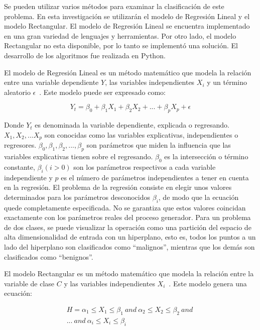 \documentclass[conference]{IEEEtran}
\begin{document}
Se pueden utilizar varios métodos para examinar la clasificación de este problema. En esta investigación se utilizarán el modelo de Regresión Lineal y el modelo Rectangular. El modelo de Regresión Lineal se encuentra implementado en una gran variedad de lenguajes y herramientas. Por otro lado, el modelo Rectangular no esta disponible, por lo tanto se implementó una solución. El desarrollo de los algoritmos fue realizada en Python. \newline

El modelo de Regresión Lineal es un método matemático que modela la relación entre una variable dependiente $Y$, las variables independientes $X_{i}$ y un término aleatorio $\epsilon$~\cite{book:BishopPRML}. Este modelo puede ser expresado como:

\begin{equation} \label{equation:LinearRegresion}
	Y_{t} = \beta_{0} + \beta_{1}X_{1} + \beta_{2}X_{2} + ... + \beta_{p}X_{p} + \epsilon
\end{equation}

Donde $Y_{t}$ es denominada la variable dependiente, explicada o regresando. $X_{1},X_{2},...X_{p}$ son conocidas como las variables explicativas, independientes o regresores. $\beta_{0},\beta_{1},\beta_{2},...,\beta_{p}$ son parámetros que miden la influencia que las variables explicativas tienen sobre el regresando. $\beta_{0}$ es la intersección o término constante, $\beta_{i} (i>0)$ son los parámetros respectivos a cada variable independiente y $p$ es el número de parámetros independientes a tener en cuenta en la regresión. El problema de la regresión consiste en elegir unos valores determinados para los parámetros desconocidos $\beta_{i}$, de modo que la ecuación quede completamente especificada. No se garantiza que estos valores coincidan exactamente con los parámetros reales del proceso generador. Para un problema de dos clases, se puede visualizar la operación como una partición del espacio de alta dimensionalidad de entrada con un hiperplano, esto es, todos los puntos a un lado del hiperplano son clasificados como ``malignos'', mientras que los demás son clasificados como ``benignos''. \newline

El modelo Rectangular es un método matemático que modela la relación entre la variable de clase $C$ y las variables independientes $X_{i}$~\cite{class:MachineLearning}. Este modelo genera una ecuación:

\begin{equation} \label{equation:RectangularModel}
	\begin{array}{ccc}
	H = \alpha_{1} \leq X_{1} \leq \beta_{1} ~and~
	    \alpha_{2} \leq X_{2} \leq \beta_{2} ~and~ \\
	    ... ~and~
	    \alpha_{i} \leq X_{i} \leq \beta_{i} \\
	\end{array}
\end{equation}
\end{document}
